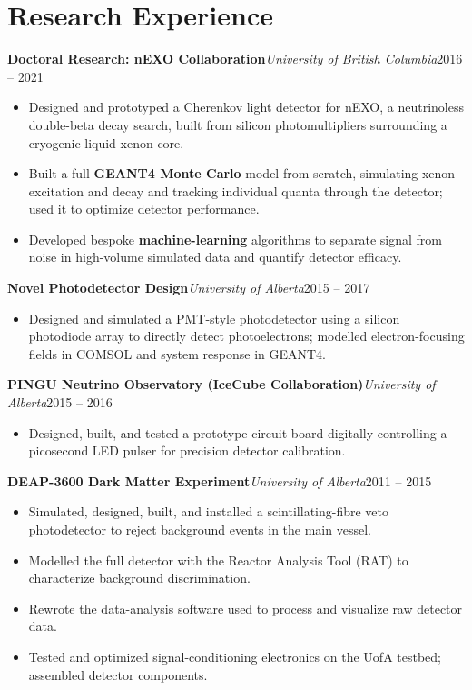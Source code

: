 \documentclass[11pt,letterpaper]{article}
\newcommand{\subentry}[3]{%
  \vspace{4pt}\textbf{#1}{\color{muted}\enspace\textperiodcentered\enspace\itshape #3}\hfill{\color{muted}#2}\par}
\begin{document}
\newpage
\section{Research Experience}

\subentry{Doctoral Research: nEXO Collaboration}{2016 -- 2021}{University of British Columbia}
\begin{itemize}
  \item Designed and prototyped a Cherenkov light detector for nEXO, a neutrinoless double-beta decay search,
        built from silicon photomultipliers surrounding a cryogenic liquid-xenon core.
  \item Built a full \textbf{GEANT4 Monte Carlo} model from scratch, simulating xenon excitation and decay and
        tracking individual quanta through the detector; used it to optimize detector performance.
  \item Developed bespoke \textbf{machine-learning} algorithms to separate signal from noise in high-volume
        simulated data and quantify detector efficacy.
\end{itemize}

\subentry{Novel Photodetector Design}{2015 -- 2017}{University of Alberta}
\begin{itemize}
  \item Designed and simulated a PMT-style photodetector using a silicon photodiode array to directly detect
        photoelectrons; modelled electron-focusing fields in COMSOL and system response in GEANT4.
\end{itemize}

\subentry{PINGU Neutrino Observatory (IceCube Collaboration)}{2015 -- 2016}{University of Alberta}
\begin{itemize}
  \item Designed, built, and tested a prototype circuit board digitally controlling a picosecond LED pulser
        for precision detector calibration.
\end{itemize}

\subentry{DEAP-3600 Dark Matter Experiment}{2011 -- 2015}{University of Alberta}
\begin{itemize}
  \item Simulated, designed, built, and installed a scintillating-fibre veto photodetector to reject
        background events in the main vessel.
  \item Modelled the full detector with the Reactor Analysis Tool (RAT) to characterize background discrimination.
  \item Rewrote the data-analysis software used to process and visualize raw detector data.
  \item Tested and optimized signal-conditioning electronics on the UofA testbed; assembled detector components.
\end{itemize}
\end{document}
